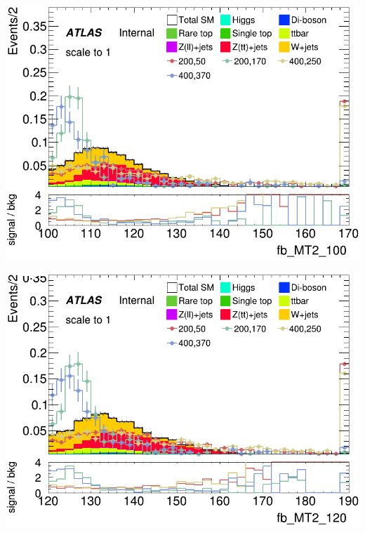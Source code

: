 \documentclass[usenames,dvipsnames]{beamer}
\begin{document}
\begin{frame}
    \begin{minipage}{0.32\textwidth}
        \centering
        \includegraphics[width=\textwidth]{graphics/HH_met_sig/HH_fb_MT2_100_norm.png}
    \end{minipage}
    \hfill
    \begin{minipage}{0.32\textwidth}
        \centering
        \includegraphics[width=\textwidth]{graphics/HH_met_sig/HH_fb_MT2_120_norm.png}
    \end{minipage}
    \hfill
    \begin{minipage}{0.32\textwidth}
        \centering

\end{minipage}
\end{frame}
\end{document}
